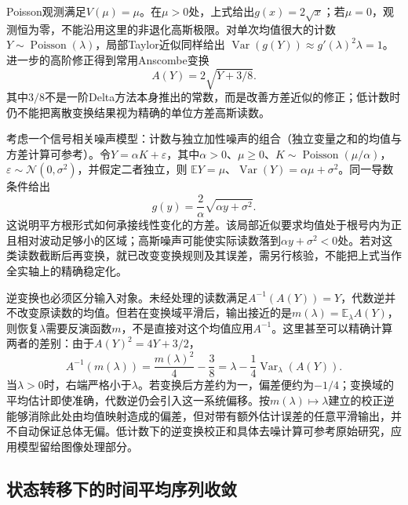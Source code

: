 Poisson观测满足\(V(\mu)=\mu\)。在\(\mu>0\)处，上式给出\(g(x)=2\sqrt x\)；若\(\mu=0\)，观测恒为零，不能沿用这里的非退化高斯极限。对单次均值很大的计数\(Y\sim\operatorname{Poisson}(\lambda)\)，局部Taylor近似同样给出
\(\operatorname{Var}(g(Y))\approx g'(\lambda)^2\lambda=1\)。进一步的高阶修正得到常用Anscombe变换
\[
 A(Y)=2\sqrt{Y+3/8}.
\]
其中\(3/8\)不是一阶Delta方法本身推出的常数，而是改善方差近似的修正；低计数时仍不能把离散变换结果视为精确的单位方差高斯读数。

考虑一个信号相关噪声模型：计数与独立加性噪声的组合（独立变量之和的均值与方差计算可参考）。令\(Y=\alpha K+\varepsilon\)，其中\(\alpha>0\)、\(\mu\geq0\)、\(K\sim\operatorname{Poisson}(\mu/\alpha)\)，\(\varepsilon\sim\mathcal N(0,\sigma^2)\)，并假定二者独立，则
\(\mathbb EY=\mu\)、\(\operatorname{Var}(Y)=\alpha\mu+\sigma^2\)。同一导数条件给出
\[
 g(y)=\frac2\alpha\sqrt{\alpha y+\sigma^2}.
\]
这说明平方根形式如何承接线性变化的方差。该局部近似要求均值处于根号内为正且相对波动足够小的区域；高斯噪声可能使实际读数落到\(\alpha y+\sigma^2<0\)处。若对这类读数截断后再变换，就已改变变换规则及其误差，需另行核验，不能把上式当作全实轴上的精确稳定化。

逆变换也必须区分输入对象。未经处理的读数满足\(A^{-1}(A(Y))=Y\)，代数逆并不改变原读数的均值。但若在变换域平滑后，输出接近的是\(m(\lambda)=\mathbb E_\lambda A(Y)\)，则恢复\(\lambda\)需要反演函数\(m\)，不是直接对这个均值应用\(A^{-1}\)。这里甚至可以精确计算两者的差别：由于\(A(Y)^2=4Y+3/2\)，
\begin{equation}
 A^{-1}(m(\lambda))
 =\frac{m(\lambda)^2}{4}-\frac38
 =\lambda-\frac14\operatorname{Var}_\lambda(A(Y)).
 \label{eq:stoch-anscombe-inverse-bias}
\end{equation}
当\(\lambda>0\)时，右端严格小于\(\lambda\)。若变换后方差约为一，偏差便约为\(-1/4\)；变换域的平均估计即使准确，代数逆仍会引入这一系统偏移。按\(m(\lambda)\mapsto\lambda\)建立的校正逆能够消除此处由均值映射造成的偏差，但对带有额外估计误差的任意平滑输出，并不自动保证总体无偏。低计数下的逆变换校正和具体去噪计算可参考原始研究，应用模型留给图像处理部分。

\subsection{状态转移下的时间平均序列收敛}
\label{sec:stoch-markov-long-run-average}

